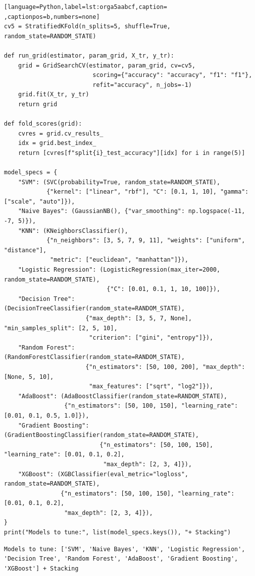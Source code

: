 \documentclass[12pt,a4paper]{article}
\begin{document}
\begin{lstlisting}[language=Python,label=lst:orga5aabcf,caption= ,captionpos=b,numbers=none]
cv5 = StratifiedKFold(n_splits=5, shuffle=True, random_state=RANDOM_STATE)

def run_grid(estimator, param_grid, X_tr, y_tr):
    grid = GridSearchCV(estimator, param_grid, cv=cv5,
                         scoring={"accuracy": "accuracy", "f1": "f1"},
                         refit="accuracy", n_jobs=-1)
    grid.fit(X_tr, y_tr)
    return grid

def fold_scores(grid):
    cvres = grid.cv_results_
    idx = grid.best_index_
    return [cvres[f"split{i}_test_accuracy"][idx] for i in range(5)]

model_specs = {
    "SVM": (SVC(probability=True, random_state=RANDOM_STATE),
            {"kernel": ["linear", "rbf"], "C": [0.1, 1, 10], "gamma": ["scale", "auto"]}),
    "Naive Bayes": (GaussianNB(), {"var_smoothing": np.logspace(-11, -7, 5)}),
    "KNN": (KNeighborsClassifier(),
            {"n_neighbors": [3, 5, 7, 9, 11], "weights": ["uniform", "distance"],
             "metric": ["euclidean", "manhattan"]}),
    "Logistic Regression": (LogisticRegression(max_iter=2000, random_state=RANDOM_STATE),
                             {"C": [0.01, 0.1, 1, 10, 100]}),
    "Decision Tree": (DecisionTreeClassifier(random_state=RANDOM_STATE),
                       {"max_depth": [3, 5, 7, None], "min_samples_split": [2, 5, 10],
                        "criterion": ["gini", "entropy"]}),
    "Random Forest": (RandomForestClassifier(random_state=RANDOM_STATE),
                       {"n_estimators": [50, 100, 200], "max_depth": [None, 5, 10],
                        "max_features": ["sqrt", "log2"]}),
    "AdaBoost": (AdaBoostClassifier(random_state=RANDOM_STATE),
                 {"n_estimators": [50, 100, 150], "learning_rate": [0.01, 0.1, 0.5, 1.0]}),
    "Gradient Boosting": (GradientBoostingClassifier(random_state=RANDOM_STATE),
                           {"n_estimators": [50, 100, 150], "learning_rate": [0.01, 0.1, 0.2],
                            "max_depth": [2, 3, 4]}),
    "XGBoost": (XGBClassifier(eval_metric="logloss", random_state=RANDOM_STATE),
                {"n_estimators": [50, 100, 150], "learning_rate": [0.01, 0.1, 0.2],
                 "max_depth": [2, 3, 4]}),
}
print("Models to tune:", list(model_specs.keys()), "+ Stacking")
\end{lstlisting}

\begin{verbatim}
Models to tune: ['SVM', 'Naive Bayes', 'KNN', 'Logistic Regression', 'Decision Tree', 'Random Forest', 'AdaBoost', 'Gradient Boosting', 'XGBoost'] + Stacking
\end{verbatim}
\end{document}
